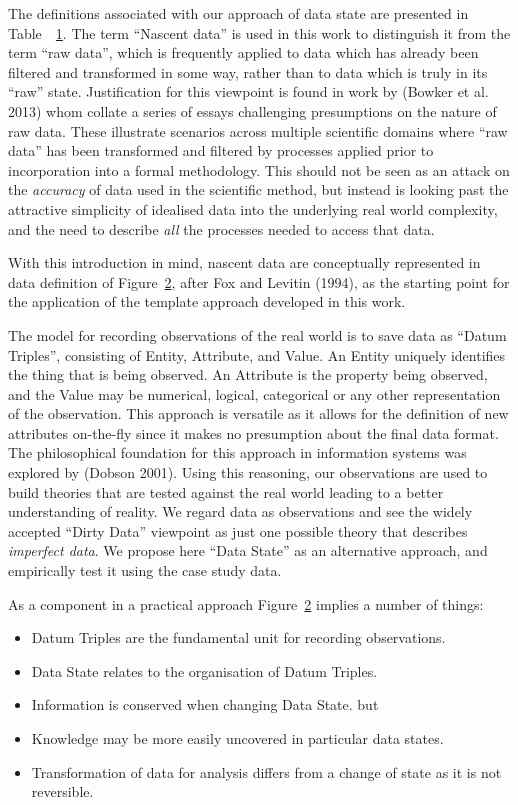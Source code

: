 \documentclass[
]{article}
\begin{document}
The definitions associated with our approach of data state are presented
in Table~~\protect\hyperlink{fig_terminology_introduction}{1}. The term
``Nascent data'' is used in this work to distinguish it from the term
``raw data'', which is frequently applied to data which has already been
filtered and transformed in some way, rather than to data which is truly
in its ``raw'' state. Justification for this viewpoint is found in work
by (Bowker et al. 2013) whom collate a series of essays challenging
presumptions on the nature of raw data. These illustrate scenarios
across multiple scientific domains where ``raw data'' has been
transformed and filtered by processes applied prior to incorporation
into a formal methodology. This should not be seen as an attack on the
\emph{accuracy} of data used in the scientific method, but instead is
looking past the attractive simplicity of idealised data into the
underlying real world complexity, and the need to describe \emph{all}
the processes needed to access that data.

With this introduction in mind, nascent data are conceptually
represented in data definition of
Figure~\protect\hyperlink{Fig-theory-nascent-data}{2}, after Fox and
Levitin (1994), as the starting point for the application of the
template approach developed in this work.

The model for recording observations of the real world is to save data
as ``Datum Triples'', consisting of Entity, Attribute, and Value. An
Entity uniquely identifies the thing that is being observed. An
Attribute is the property being observed, and the Value may be
numerical, logical, categorical or any other representation of the
observation. This approach is versatile as it allows for the definition
of new attributes on-the-fly since it makes no presumption about the
final data format. The philosophical foundation for this approach in
information systems was explored by (Dobson 2001). Using this reasoning,
our observations are used to build theories that are tested against the
real world leading to a better understanding of reality. We regard data
as observations and see the widely accepted ``Dirty Data'' viewpoint as
just one possible theory that describes \emph{imperfect data}. We
propose here ``Data State'' as an alternative approach, and empirically
test it using the case study data.

As a component in a practical approach
Figure~\protect\hyperlink{Fig-theory-nascent-data}{2} implies a number
of things:

\begin{itemize}
\item
  Datum Triples are the fundamental unit for recording observations.
\item
  Data State relates to the organisation of Datum Triples.
\item
  Information is conserved when changing Data State. but
\item
  Knowledge may be more easily uncovered in particular data states.
\item
  Transformation of data for analysis differs from a change of state as
  it is not reversible.
\end{itemize}
\end{document}
